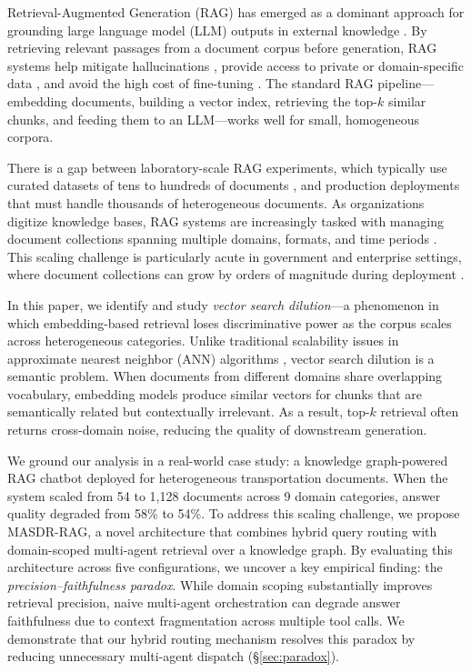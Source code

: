 \documentclass{article}
\newcommand{\systemname}{\textsc{MASDR-RAG}}
\newcommand{\numDocs}{1{,}128}
\begin{document}
Retrieval-Augmented Generation (RAG) has emerged as a dominant approach for grounding large language model (LLM) outputs in external knowledge \cite{lewis2020rag, guu2020realm}. By retrieving relevant passages from a document corpus before generation, RAG systems help mitigate hallucinations \cite{shuster2021retrieval, huang2024hallucination}, provide access to private or domain-specific data \cite{gao2024ragsurvey}, and avoid the high cost of fine-tuning \cite{izacard2023atlas}. The standard RAG pipeline---embedding documents, building a vector index, retrieving the top-$k$ similar chunks, and feeding them to an LLM---works well for small, homogeneous corpora.

There is a gap between laboratory-scale RAG experiments, which typically use curated datasets of tens to hundreds of documents \cite{kwiatkowski2019natural, joshi2017triviaqa}, and production deployments that must handle thousands of heterogeneous documents. As organizations digitize knowledge bases, RAG systems are increasingly tasked with managing document collections spanning multiple domains, formats, and time periods \cite{barnett2024seven}. This scaling challenge is particularly acute in government and enterprise settings, where document collections can grow by orders of magnitude during deployment \cite{wu2025rag4cm}.

In this paper, we identify and study \textit{vector search dilution}---a phenomenon in which embedding-based retrieval loses discriminative power as the corpus scales across heterogeneous categories. Unlike traditional scalability issues in approximate nearest neighbor (ANN) algorithms \cite{malkov2020hnsw, johnson2021faiss}, vector search dilution is a semantic problem. When documents from different domains share overlapping vocabulary, embedding models produce similar vectors for chunks that are semantically related but contextually irrelevant. As a result, top-$k$ retrieval often returns cross-domain noise, reducing the quality of downstream generation.

We ground our analysis in a real-world case study: a knowledge graph-powered RAG chatbot deployed for heterogeneous transportation documents. When the system scaled from 54 to \numDocs{} documents across 9 domain categories, answer quality degraded from 58\% to 54\%. 
To address this scaling challenge, we propose \systemname{}, a novel architecture that combines hybrid query routing with domain-scoped multi-agent retrieval over a knowledge graph. 
By evaluating this architecture across five configurations, we uncover a key empirical finding: the \textit{precision--faithfulness paradox}. While domain scoping substantially improves retrieval precision, naive multi-agent orchestration can degrade answer faithfulness due to context fragmentation across multiple tool calls. We demonstrate that our hybrid routing mechanism resolves this paradox by reducing unnecessary multi-agent dispatch (\S\ref{sec:paradox}).
\end{document}
